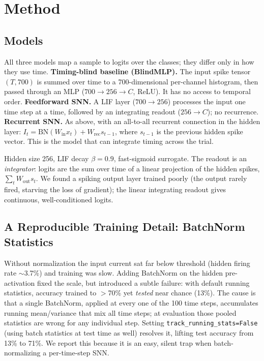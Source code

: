 \documentclass[11pt]{article}
\begin{document}
\section{Method}
\label{sec:method}

\subsection{Models}
All three models map a sample to logits over the classes; they differ only in how they use time.
\textbf{Timing-blind baseline (BlindMLP).} The input spike tensor $(T, 700)$ is summed over time to a 700-dimensional per-channel histogram, then passed through an MLP ($700 \to 256 \to C$, ReLU). It has no access to temporal order.
\textbf{Feedforward SNN.} A LIF layer ($700 \to 256$) processes the input one time step at a time, followed by an integrating readout ($256 \to C$); no recurrence.
\textbf{Recurrent SNN.} As above, with an all-to-all recurrent connection in the hidden layer: $I_t = \mathrm{BN}(W_{\text{in}} x_t) + W_{\text{rec}} s_{t-1}$, where $s_{t-1}$ is the previous hidden spike vector. This is the model that can integrate timing across the trial.

Hidden size 256, LIF decay $\beta = 0.9$, fast-sigmoid surrogate. The readout is an \emph{integrator}: logits are the sum over time of a linear projection of the hidden spikes, $\sum_t W_{\text{out}} s_t$. We found a spiking output layer trained poorly (the output rarely fired, starving the loss of gradient); the linear integrating readout gives continuous, well-conditioned logits.

\subsection{A Reproducible Training Detail: BatchNorm Statistics}
Without normalization the input current sat far below threshold (hidden firing rate $\sim$3.7\%) and training was slow. Adding BatchNorm on the hidden pre-activation fixed the scale, but introduced a subtle failure: with default running statistics, accuracy trained to $>$70\% yet \emph{tested} near chance (13\%). The cause is that a single BatchNorm, applied at every one of the 100 time steps, accumulates running mean/variance that mix all time steps; at evaluation those pooled statistics are wrong for any individual step. Setting \texttt{track\_running\_stats=False} (using batch statistics at test time as well) resolves it, lifting test accuracy from 13\% to 71\%. We report this because it is an easy, silent trap when batch-normalizing a per-time-step SNN.
\end{document}
